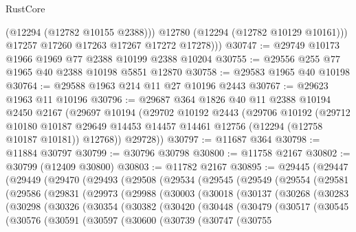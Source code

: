 \begin{lexlean}{RustCore}
\begin{coremodule}
              (@12294 (@12782 @10155 @2388)))
            @12780
            (@12294 (@12782 @10129 @10161)))
          @17257
          @17260
          @17263
          @17267
          @17272
          @17278)))
@30747 := @29749 @10173 @1966 @1969 @77 @2388 @10199 @2388 @10204
@30755 := @29556 @255 @77 @1965 @40 @2388 @10198 @5851 @12870
@30758 := @29583 @1965 @40 @10198
@30764 := @29588 @1963 @214 @11 @27 @10196 @2443
@30767 := @29623 @1963 @11 @10196
@30796 := @29687
    @364
    @1826
    @40
    @11
    @2388
    @10194
    @2450
    @2167
    (@29697
      @10194
      (@29702
        @10192
        @2443
        (@29706
          @10192
          (@29712
            @10180
            @10187
            @29649
            @14453
            @14457
            @14461
            @12756
            (@12294 (@12758 @10187 @10181))
            @12768))
        @29728))
@30797 := @11687 @364
@30798 := @11884 @30797
@30799 := @30796 @30798
@30800 := @11758 @2167
@30802 := @30799 (@12409 @30800)
@30803 := @11782 @2167
@30895 := @29445
    (@29447
      (@29449
        (@29470
          (@29493
            (@29508
              (@29534
                (@29545
                  (@29549
                    (@29554
                      (@29581
                        (@29586
                          (@29831
                            (@29973
                              (@29988
                                (@30003
                                  (@30018
                                    (@30137
                                      (@30268
                                        (@30283
                                          (@30298
                                            (@30326
                                              (@30354
                                                (@30382
                                                  (@30420
                                                    (@30448
                                                      (@30479
                                                        (@30517
                                                          (@30545
                                                            (@30576
                                                              (@30591
                                                                (@30597
                                                                  (@30600
                                                                    (@30739
                                                                      (@30747
                                                                        (@30755

\end{coremodule}
\end{lexlean}
